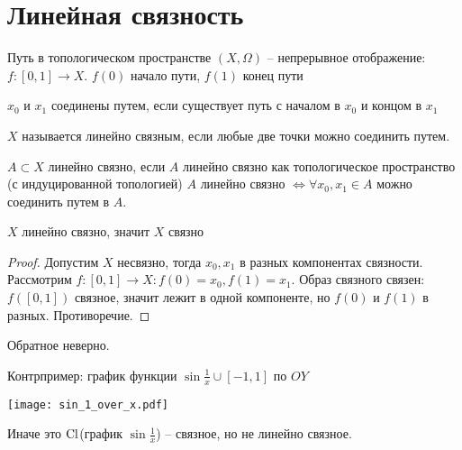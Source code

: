\documentclass[main]{subfiles}
\begin{document}
\section{Линейная связность}
\begin{definition}
    Путь в топологическом пространстве $(X, \Omega)$ -- непрерывное отображение:
    $f: [0,1] \to X$. $f(0)$ начало пути, $f(1)$ конец пути
\end{definition}
\begin{definition}
    $x_0$ и $x_1$ соединены путем, если существует путь с началом в $x_0$ и концом в $x_1$
\end{definition}
\begin{definition}
    $X$ называется линейно связным, если любые две точки можно соединить путем.

    $A \subset X$ линейно связно, если $A$ линейно связно как топологическое пространство (с индуцированной топологией)
    $A$ линейно связно $\Leftrightarrow \forall x_0, x_1 \in A$ можно соединить путем в $A$.
\end{definition}
\begin{theorem}
    $X$ линейно связно, значит $X$ связно
\end{theorem}
\begin{proof}
    Допустим $X$ несвязно, тогда $x_0, x_1$ в разных компонентах связности.
    Рассмотрим $f: [0, 1] \to X: f(0) = x_0, f(1) = x_1$.
    Образ связного связен: $f([0, 1])$ связное,
    значит лежит в одной компоненте, но $f(0)$ и $f(1)$ в разных. Противоречие.
\end{proof}
\begin{remark}
    Обратное неверно.
\end{remark}
\begin{example}
    Контрпример: график функции $\sin \frac{1}{x} \cup [-1, 1]$ по $OY$
    \begin{center}
        \texttt{[image: sin\_1\_over\_x.pdf]}
    \end{center}
    Иначе это $\operatorname{Cl}$(график $\sin \frac{1}{x}$) -- связное, но не линейно связное.
\end{example}
\end{document}
